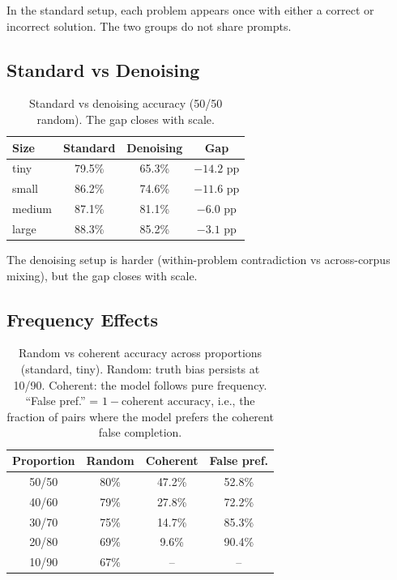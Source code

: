 \documentclass{article}
\begin{document}
In the standard setup, each problem appears once with either a correct or incorrect solution. The two groups do not share prompts.

\subsection{Standard vs Denoising}

\begin{table}[h]
\centering
\small
\begin{tabular}{lccc}
\toprule
Size & Standard & Denoising & Gap \\
\midrule
tiny   & 79.5\% & 65.3\% & $-14.2$ pp \\
small  & 86.2\% & 74.6\% & $-11.6$ pp \\
medium & 87.1\% & 81.1\% & $-6.0$ pp \\
large  & 88.3\% & 85.2\% & $-3.1$ pp \\
\bottomrule
\end{tabular}
\caption{Standard vs denoising accuracy (50/50 random). The gap closes with scale.}
\label{tab:standard_vs_denoising}
\end{table}

The denoising setup is harder (within-problem contradiction vs across-corpus mixing), but the gap closes with scale.

\subsection{Frequency Effects}

\begin{table}[h]
\centering
\small
\begin{tabular}{cccc}
\toprule
Proportion & Random & Coherent & False pref. \\
\midrule
50/50 & 80\% & 47.2\% & 52.8\% \\
40/60 & 79\% & 27.8\% & 72.2\% \\
30/70 & 75\% & 14.7\% & 85.3\% \\
20/80 & 69\% & 9.6\%  & 90.4\% \\
10/90 & 67\% & --     & -- \\
\bottomrule
\end{tabular}
\caption{Random vs coherent accuracy across proportions (standard, tiny). Random: truth bias persists at 10/90. Coherent: the model follows pure frequency. ``False pref.'' = $1 - \text{coherent accuracy}$, i.e., the fraction of pairs where the model prefers the coherent false completion.}
\label{tab:frequency}
\end{table}
\end{document}
